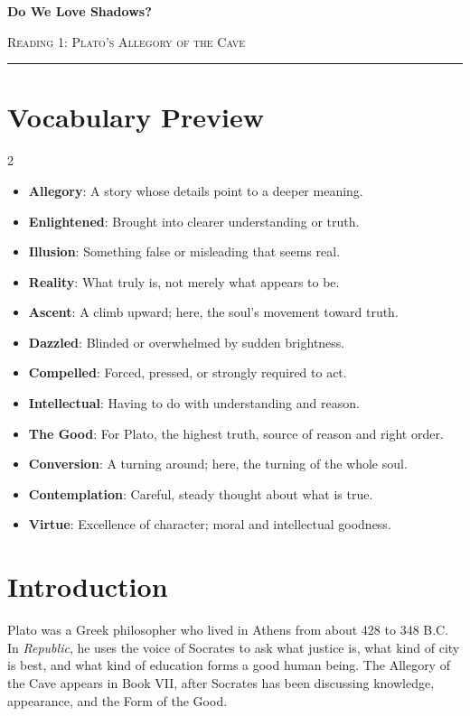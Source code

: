 \documentclass[12pt]{article}
\begin{document}
\begin{center}
{\LARGE\bfseries Do We Love Shadows?}\par\vspace{0.25em}
{\large\scshape Reading 1: Plato's Allegory of the Cave}\par\vspace{0.45em}
\rule{0.82\textwidth}{0.4pt}\par\vspace{0.7em}
\end{center}

\section*{Vocabulary Preview}
\begin{multicols}{2}
\begin{itemize}[leftmargin=*, itemsep=0.18em]
\item \textbf{Allegory}: A story whose details point to a deeper meaning.
\item \textbf{Enlightened}: Brought into clearer understanding or truth.
\item \textbf{Illusion}: Something false or misleading that seems real.
\item \textbf{Reality}: What truly is, not merely what appears to be.
\item \textbf{Ascent}: A climb upward; here, the soul's movement toward truth.
\item \textbf{Dazzled}: Blinded or overwhelmed by sudden brightness.
\item \textbf{Compelled}: Forced, pressed, or strongly required to act.
\item \textbf{Intellectual}: Having to do with understanding and reason.
\item \textbf{The Good}: For Plato, the highest truth, source of reason and right order.
\item \textbf{Conversion}: A turning around; here, the turning of the whole soul.
\item \textbf{Contemplation}: Careful, steady thought about what is true.
\item \textbf{Virtue}: Excellence of character; moral and intellectual goodness.
\end{itemize}
\end{multicols}

\section*{Introduction}
Plato was a Greek philosopher who lived in Athens from about 428 to 348 B.C. In \textit{Republic}, he uses the voice of Socrates to ask what justice is, what kind of city is best, and what kind of education forms a good human being. The Allegory of the Cave appears in Book VII, after Socrates has been discussing knowledge, appearance, and the Form of the Good.
\end{document}
